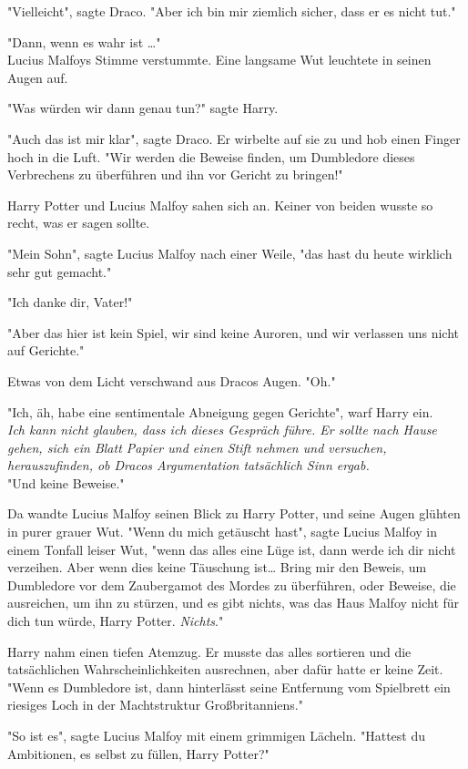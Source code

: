{"Vielleicht", sagte Draco. "Aber ich bin mir ziemlich sicher, dass er es nicht tut."

"Dann, wenn es wahr ist …"\\ Lucius Malfoys Stimme verstummte. Eine langsame Wut leuchtete in seinen Augen auf.

"Was würden wir dann genau tun?" sagte Harry.

"Auch das ist mir klar", sagte Draco. Er wirbelte auf sie zu und hob einen Finger hoch in die Luft. "Wir werden die Beweise finden, um Dumbledore dieses Verbrechens zu überführen und ihn vor Gericht zu bringen!"

Harry Potter und Lucius Malfoy sahen sich an. Keiner von beiden wusste so recht, was er sagen sollte.

"Mein Sohn", sagte Lucius Malfoy nach einer Weile, "das hast du heute wirklich sehr gut gemacht."

"Ich danke dir, Vater!"

"Aber das hier ist kein Spiel, wir sind keine Auroren, und wir verlassen uns nicht auf Gerichte."

Etwas von dem Licht verschwand aus Dracos Augen. "Oh."

"Ich, äh, habe eine sentimentale Abneigung gegen Gerichte", warf Harry ein.\\ \emph{Ich kann nicht glauben, dass ich dieses Gespräch führe. Er sollte nach Hause gehen, sich ein Blatt Papier und einen Stift nehmen und versuchen, herauszufinden, ob Dracos Argumentation tatsächlich Sinn ergab.}\\ "Und keine Beweise."

Da wandte Lucius Malfoy seinen Blick zu Harry Potter, und seine Augen glühten in purer grauer Wut. "Wenn du mich getäuscht hast", sagte Lucius Malfoy in einem Tonfall leiser Wut, "wenn das alles eine Lüge ist, dann werde ich dir nicht verzeihen. Aber wenn dies keine Täuschung ist… Bring mir den Beweis, um Dumbledore vor dem Zaubergamot des Mordes zu überführen, oder Beweise, die ausreichen, um ihn zu stürzen, und es gibt nichts, was das Haus Malfoy nicht für dich tun würde, Harry Potter. \emph{Nichts}."

Harry nahm einen tiefen Atemzug. Er musste das alles sortieren und die tatsächlichen Wahrscheinlichkeiten ausrechnen, aber dafür hatte er keine Zeit.\\ "Wenn es Dumbledore ist, dann hinterlässt seine Entfernung vom Spielbrett ein riesiges Loch in der Machtstruktur Großbritanniens."

"So ist es", sagte Lucius Malfoy mit einem grimmigen Lächeln. "Hattest du Ambitionen, es selbst zu füllen, Harry Potter?"

}
